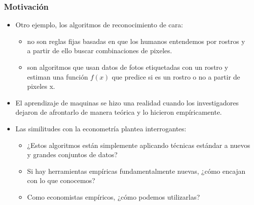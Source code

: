 \documentclass[
  shownotes,
  xcolor={svgnames},
  hyperref={colorlinks,citecolor=DarkBlue,linkcolor=DarkRed,urlcolor=DarkBlue}
  , aspectratio=169]{beamer}
\begin{document}
\begin{frame}
\frametitle{Motivación}

\begin{itemize}
      \item Otro ejemplo, los algoritmos de reconocimiento de cara: 
      \medskip
      \begin{itemize}
        \item no son reglas fijas basadas en que los humanos entendemos por rostros y a partir de ello buscar combinaciones de pixeles.
        \item son algoritmos que usan datos de fotos etiquetadas con un rostro y estiman una función $f(x)$ que predice si es un rostro o no a partir de pixeles x.
      \end{itemize}
      \medskip
      \item El aprendizaje de maquinas se hizo una realidad cuando los investigadores dejaron de afrontarlo de manera teórica y lo hicieron empíricamente.
      \medskip
      \item  Las similitudes con la econometría plantea interrogantes:
      \begin{itemize}
      \item  ¿Estos algoritmos están simplemente aplicando técnicas estándar a nuevos y grandes conjuntos de datos? 
      \item  Si hay herramientas empíricas fundamentalmente nuevas, ¿cómo encajan con lo que conocemos? 
      \item  Como economistas empíricos, ¿cómo podemos utilizarlas?
       \end{itemize}
\end{itemize}

\end{frame}

\end{document}
